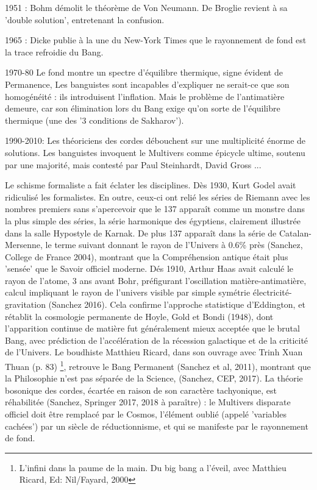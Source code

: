 \documentclass[a4paper,12pt]{article}
\begin{document}
1951 : Bohm démolit le théorème de Von Neumann. De Broglie revient à sa 'double solution', entretenant la confusion.

1965 : Dicke publie à la une du New-York Times que le rayonnement de fond est la trace refroidie du Bang.

1970-80 Le fond montre un spectre d'équilibre thermique, signe évident de Permanence, Les banguistes sont incapables d'expliquer ne serait-ce que son homogénéité : ils introduisent l'inflation. Mais le problème de l'antimatière demeure, car son élimination lors du Bang exige qu'on sorte de l'équilibre thermique (une des '3 conditions de Sakharov').

1990-2010:  Les théoriciens des cordes débouchent sur une multiplicité énorme de solutions. Les banguistes invoquent le Multivers comme épicycle ultime, soutenu par une majorité, mais contesté par Paul Steinhardt, David Gross ...

Le schisme formaliste a fait éclater les disciplines. Dès 1930, Kurt Godel avait ridiculisé les formalistes. En outre, ceux-ci ont relié les séries de Riemann avec les nombres premiers sans s'apercevoir que le 137 apparaît comme un monstre dans la plus simple des séries, la série harmonique des égyptiens, clairement illustrée dans la salle Hypostyle de Karnak. De plus 137 apparaît dans la série de Catalan-Mersenne, le terme suivant donnant le rayon de l'Univers à 0.6\% près (Sanchez, College de France 2004), montrant que la Compréhension antique était plus 'sensée' que le Savoir officiel moderne. Dés 1910, Arthur Haas avait calculé le rayon de l'atome, 3 ans avant Bohr, préfigurant l'oscillation matière-antimatière, calcul impliquant le rayon de l'univers visible par simple symétrie électricité-gravitation (Sanchez 2016). Cela confirme l'approche statistique d'Eddington, et rétablit la cosmologie permanente de Hoyle, Gold et Bondi (1948), dont l'apparition continue de matière fut généralement mieux acceptée que le brutal Bang, avec prédiction de l'accélération de la récession galactique et de la criticité de l'Univers. Le boudhiste Matthieu Ricard, dans son ouvrage avec Trinh Xuan Thuan (p. 83) \footnote{L'infini dans la paume de la main. Du big bang a l'éveil, avec Matthieu Ricard, Ed: Nil/Fayard, 2000}, retrouve le Bang Permanent (Sanchez et al, 2011), montrant que la Philosophie n'est pas séparée de la Science, (Sanchez, CEP, 2017). La théorie bosonique des cordes, écartée en raison de son caractère tachyonique, est réhabilitée (Sanchez, Springer 2017, 2018 à paraître) : le Multivers disparate officiel doit être remplacé par le Cosmos, l'élément oublié (appelé 'variables cachées') par un siècle de réductionnisme, et qui se manifeste par le rayonnement de fond.
\end{document}

